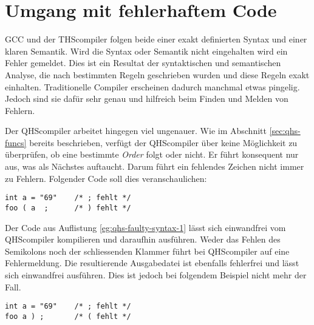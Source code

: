 \section{Umgang mit fehlerhaftem Code}
GCC und der THScompiler folgen beide einer exakt definierten Syntax und einer klaren Semantik.
Wird die Syntax oder Semantik nicht eingehalten wird ein Fehler gemeldet.
Dies ist ein Resultat der syntaktischen und semantischen Analyse, die nach bestimmten Regeln geschrieben wurden und diese Regeln exakt einhalten.
Traditionelle Compiler erscheinen dadurch manchmal etwas pingelig. Jedoch sind sie dafür sehr genau und hilfreich beim Finden und Melden von Fehlern.

Der QHScompiler arbeitet hingegen viel ungenauer.
Wie im Abschnitt \ref{sec:qhs-funcs} bereits beschrieben, verfügt der QHScompiler über keine Möglichkeit zu überprüfen, ob eine bestimmte \textit{Order} folgt oder nicht.
Er führt konsequent nur aus, was als Nächstes auftaucht. Darum führt ein fehlendes Zeichen nicht immer zu Fehlern.
Folgender Code soll dies veranschaulichen:

\begin{lstlisting}[language=QHS, caption=QHS mit fehlenden Tokens, label=eg:qhs-faulty-syntax-1]
int a = "69"    /* ; fehlt */
foo ( a  ;      /* ) fehlt */
\end{lstlisting}

Der Code aus Auflistung \ref{eg:qhs-faulty-syntax-1} lässt sich einwandfrei vom QHScompiler kompilieren und daraufhin ausführen.
Weder das Fehlen des Semikolons noch der schliessenden Klammer führt bei QHScompiler auf eine Fehlermeldung.
Die resultierende Ausgabedatei ist ebenfalls fehlerfrei und lässt sich einwandfrei ausführen. 
Dies ist jedoch bei folgendem Beispiel nicht mehr der Fall.

\begin{lstlisting}[language=QHS, caption=QHS mit fehlender öffnender Klammer, label=eg:qhs-faulty-syntax-2]
int a = "69"    /* ; fehlt */
foo a ) ;       /* ( fehlt */
\end{lstlisting}

